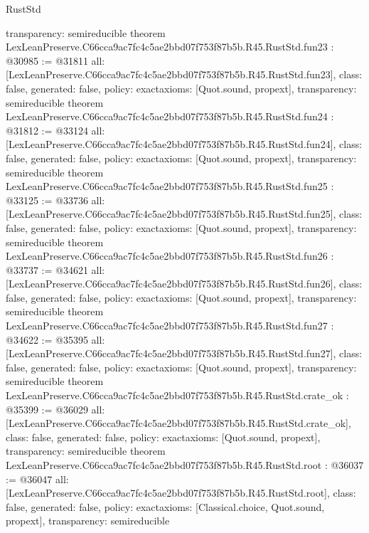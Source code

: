 \begin{lexlean}{RustStd}
\begin{coremodule}
{  transparency: semireducible
}
theorem LexLeanPreserve.C66cca9ac7fc4c5ae2bbd07f753f87b5b.R45.RustStd.fun23 : @30985 := @31811 {
  all: [LexLeanPreserve.C66cca9ac7fc4c5ae2bbd07f753f87b5b.R45.RustStd.fun23],
  class: false,
  generated: false,
  policy: exact{axioms: [Quot.sound, propext]},
  transparency: semireducible
}
theorem LexLeanPreserve.C66cca9ac7fc4c5ae2bbd07f753f87b5b.R45.RustStd.fun24 : @31812 := @33124 {
  all: [LexLeanPreserve.C66cca9ac7fc4c5ae2bbd07f753f87b5b.R45.RustStd.fun24],
  class: false,
  generated: false,
  policy: exact{axioms: [Quot.sound, propext]},
  transparency: semireducible
}
theorem LexLeanPreserve.C66cca9ac7fc4c5ae2bbd07f753f87b5b.R45.RustStd.fun25 : @33125 := @33736 {
  all: [LexLeanPreserve.C66cca9ac7fc4c5ae2bbd07f753f87b5b.R45.RustStd.fun25],
  class: false,
  generated: false,
  policy: exact{axioms: [Quot.sound, propext]},
  transparency: semireducible
}
theorem LexLeanPreserve.C66cca9ac7fc4c5ae2bbd07f753f87b5b.R45.RustStd.fun26 : @33737 := @34621 {
  all: [LexLeanPreserve.C66cca9ac7fc4c5ae2bbd07f753f87b5b.R45.RustStd.fun26],
  class: false,
  generated: false,
  policy: exact{axioms: [Quot.sound, propext]},
  transparency: semireducible
}
theorem LexLeanPreserve.C66cca9ac7fc4c5ae2bbd07f753f87b5b.R45.RustStd.fun27 : @34622 := @35395 {
  all: [LexLeanPreserve.C66cca9ac7fc4c5ae2bbd07f753f87b5b.R45.RustStd.fun27],
  class: false,
  generated: false,
  policy: exact{axioms: [Quot.sound, propext]},
  transparency: semireducible
}
theorem LexLeanPreserve.C66cca9ac7fc4c5ae2bbd07f753f87b5b.R45.RustStd.crate_ok : @35399 := @36029 {
  all: [LexLeanPreserve.C66cca9ac7fc4c5ae2bbd07f753f87b5b.R45.RustStd.crate_ok],
  class: false,
  generated: false,
  policy: exact{axioms: [Quot.sound, propext]},
  transparency: semireducible
}
theorem LexLeanPreserve.C66cca9ac7fc4c5ae2bbd07f753f87b5b.R45.RustStd.root : @36037 := @36047 {
  all: [LexLeanPreserve.C66cca9ac7fc4c5ae2bbd07f753f87b5b.R45.RustStd.root],
  class: false,
  generated: false,
  policy: exact{axioms: [Classical.choice, Quot.sound, propext]},
  transparency: semireducible
}


\end{coremodule}
\end{lexlean}
